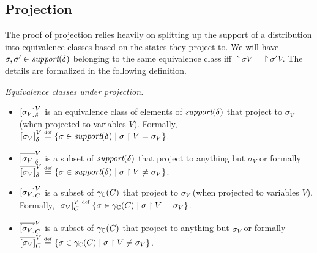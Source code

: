 \subsection{Projection}

The proof of projection relies heavily on splitting up the support of a
distribution into equivalence classes based on the states they project
to. We will have $ \sigma, \sigma' \in \textit{support}(\delta) $ belonging to
the same equivalence class iff $ \project{\sigma}{V}
= \project{\sigma'}{V} $. The details are formalized in the following definition.

\begin{definition} \emph{Equivalence classes under projection.}
\begin{itemize}
\item{} $ \left[ \sigma_V \right]_{\delta}^{V} $ is an equivalence class of
elements of 
$ \textit{support}(\delta) $ that project to $ \sigma_V $ (when projected to
variables $ V $). Formally,
$ \left[ \sigma_V \right]_{\delta}^{V} \stackrel{\smash{\scriptscriptstyle \mathrm{def}}}= \left\{ \sigma \in \textit{support}(\delta) \;|\; \sigma \upharpoonright V
= \sigma_V \right\} $.

\item{} $ \overline{\left[ \sigma_V \right]}_{\delta}^{V} $ is a subset of
$ \textit{support}(\delta) $ that project to anything but $ \sigma_V $ or formally
$ \overline{\left[ \sigma_V \right]}_{\delta}^{V} \stackrel{\smash{\scriptscriptstyle \mathrm{def}}}= \left\{ \sigma \in \textit{support}(\delta) \;|\;
\sigma \upharpoonright V \neq \sigma_V \right\} $. 

\item{} $ \left[ \sigma_V \right]_{C_{}}^{V} $ is a subset of
$ \gamma_{\mathbb{C}}(C) $ that project to $ \sigma_V $ (when projected to
variables $ V $). Formally,
$ \left[ \sigma_V \right]_{C_{}}^{V} \stackrel{\smash{\scriptscriptstyle \mathrm{def}}}= \left\{ \sigma \in \gamma_{\mathbb{C}}(C_{}) \;|\; \sigma \upharpoonright V
= \sigma_V \right\} $.

\item{} $ \overline{\left[ \sigma_V \right]}_{C_{}}^{V} $ is a subset of
$ \gamma_{\mathbb{C}}(C_{}) $ that project to anything but $ \sigma_V $ or formally
$ \overline{\left[ \sigma_V \right]}_{C_{}}^{V} \stackrel{\smash{\scriptscriptstyle \mathrm{def}}}= \left\{ \sigma \in \gamma_{\mathbb{C}}(C_{}) \;|\;
\sigma \upharpoonright V \neq \sigma_V \right\} $.
\end{itemize}
\end{definition}

